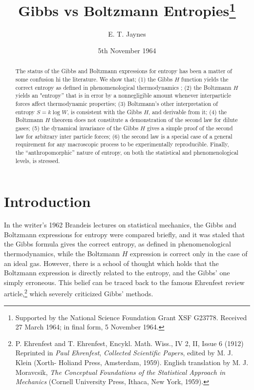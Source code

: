 \documentclass[twocolumn]{article}
\title{Gibbs vs Boltzmann Entropies\footnote{Supported by the National
  Science Foundation Grant XSF G23778. Received 27 March 1964; in final form, 5 November 1964.}}
\author{E. T. Jaynes}
\date{5th November 1964}
\affil{Department of Physics, Washington University, St. Louis, Missouri}
\begin{document}
\maketitle


\begin{abstract}
The status of the Gibbs and Boltzmann expressions for entropy has been
a matter of some confusion hi the literature. We show that; (1) the
Gibbs $H$ function yields the correct entropy as defined in
phenomenological thermodynamics ; (2) the Boltzmann $H$ yields an
"entropy'' that is in error by a nonnegligible amount whenever
interparticle forces affect thermodynamic properties; (3) Boltzmann's
other interpretation of entropy $S = k\log W$, is consistent with
the Gibbs $H$, and derivable from it; (4) the Boltzmann $H$
theorem does not constitute a demonstration of the second law for dilute
gases; (5) the dynamical invariance of the Gibbs $H$ gives a simple
proof of the second law for arbitrary inter particle forces; (6) the
second law is a special case of a general requirement for any
macroscopic process to be experimentally reproducible. Finally, the
``anthropomorphic'' nature of entropy, on both the statistical and
phenomenological levels, is stressed.
\end{abstract}

\section{Introduction}\label{sec-introduction}

In the writer's 1962 Brandeis lectures \cite{Jaynes-brandeis62} on statistical mechanics, the Gibbs and
Boltzmann expressions for entropy were compared briefly, and it was
staled that the Gibbs formula gives the correct entropy, as defined in
phenomenological thermodynamics, while the Boltzmann $H$ expression
is correct only in the case of an ideal gas. However, there is a school
of thought which holds that the Boltzmann expression is directly related
to the entropy, and the Gibbs' one simply erroneous. This belief can be
traced back to the famous Ehrenfest review article,\footnote{P.
  Ehrenfest and T. Ehrenfest, Encykl. Math. Wiss., IV 2, II, Issue 6
  (1912) Reprinted in \emph{Paul Ehrenfest}, \emph{Collected Scientific
  Papers}, edited by M. J. Klein (Xorth- Holiand Press, Amsterdam,
  1959). English translation by M. J. Moravcsik, \emph{The Conceptual
  Foundations of the Statistical Approach in Mechanics} (Cornell
  University Press, Ithaca, New York, 1959).} which severely criticized
Gibbs' methods.
\end{document}
